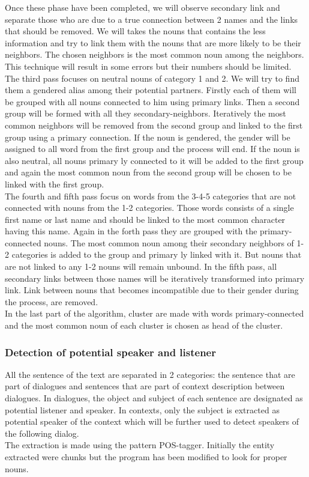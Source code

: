 \documentclass[a4paper, 12pt]{report}
\begin{document}
Once these phase have been completed, we will observe secondary link and separate those who are due to a true connection between 2 names and the links that should be removed.  We will takes the nouns that contains the less information and try to link them with the nouns that are more likely to be their neighbors. The chosen neighbors is the most common noun among the neighbors. This technique will result in some errors but their numbers should be limited.
\\
The third pass focuses on neutral nouns of category 1 and 2. We will try to find them a gendered alias among their potential partners. Firstly each of them will be grouped with all nouns connected to him using  primary links. Then a second group will be formed with all they secondary-neighbors. Iteratively the most common neighbors  will be removed from the second group and linked to the first group using a  primary  connection. If the noun is gendered, the gender will be assigned to all word from the first group and the process will end. If the noun is also neutral, all nouns  primary ly connected to it will be added to the first group and again the most common noun from the second group will be chosen to be linked with the first group. 
\\
The fourth and fifth pass focus on words from the 3-4-5 categories that are not connected with nouns from the 1-2 categories. Those words consists of a single first name or last name and should be linked to the most common character having this name. Again in the forth pass they are grouped with the primary-connected nouns. The most common noun among their secondary neighbors of 1-2 categories is added to the group and  primary ly linked with it. But nouns that are not linked to any 1-2 nouns will remain unbound. In the fifth pass, all secondary links between those names will be iteratively transformed into primary link. Link between nouns that becomes incompatible due to their gender during the process, are removed.
\\
In the last part of the algorithm, cluster are made with words primary-connected and the most common noun of each cluster is chosen as  head of the cluster.
\\

\subsubsection{Detection of potential speaker and listener}
All the sentence of the text are separated in 2 categories: the sentence that are part of dialogues and sentences that are part of context description between dialogues.
In dialogues, the object and subject of each sentence are designated as potential listener and speaker. In contexts, only the subject is extracted as potential speaker of the context which will be further used to detect speakers of the following dialog. \\
The extraction is made using the pattern POS-tagger. Initially the entity extracted were chunks but the program has been modified to look for proper nouns.\\
\end{document}
